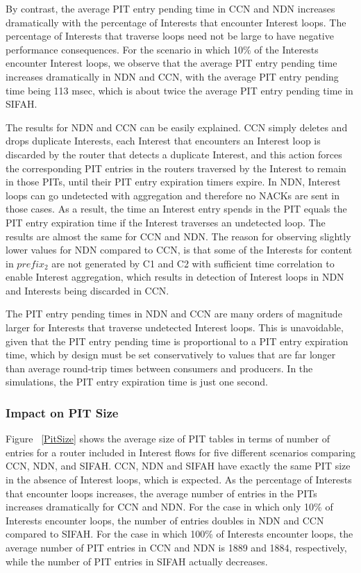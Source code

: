 \documentclass{ancs15-alternate}
\begin{document}
By contrast, the average PIT entry pending time in CCN and NDN increases dramatically with the percentage of  Interests that 
encounter  Interest loops. The percentage of Interests that traverse loops need not be large to have negative performance consequences. For the scenario in which  10\%  of the Interests 
encounter Interest  loops, we observe that the average PIT entry pending time increases dramatically in NDN and CCN, with the average PIT entry pending time being 113 msec, which is about twice the average PIT entry pending time in SIFAH.  

The results for NDN and CCN can be easily explained. CCN simply deletes and drops duplicate Interests, each Interest that encounters an Interest loop is discarded by the router that detects a duplicate Interest, and this action forces the corresponding PIT entries in the routers traversed by the Interest to remain in those PITs, until their PIT entry expiration timers expire. 
In NDN, Interest loops  can go undetected with aggregation and therefore no NACKs are sent in those cases. As a result, the time an Interest entry spends in the PIT  equals the PIT entry expiration time if the Interest traverses an undetected loop.
The results are almost the same for CCN and NDN. The reason for observing slightly lower values for NDN compared to CCN, is that some of the Interests for content in $prefix_2$ are not generated by C1 and C2 with sufficient time correlation to enable  Interest aggregation, which results in detection of Interest loops in NDN and Interests being discarded in CCN.

The PIT entry pending times in NDN and CCN are many orders of magnitude larger for Interests that traverse undetected Interest loops. This is unavoidable,  given that the PIT entry pending time is  proportional to a PIT entry expiration time, which by design must be set conservatively to values that are far longer than average round-trip times between consumers and producers. 
In the simulations, the PIT entry expiration time is just one second.

\subsubsection{Impact on PIT Size}

Figure ~\ref{PitSize} shows the average size of PIT tables in terms of number of entries for a router included in Interest  flows for five different scenarios comparing CCN, NDN, and SIFAH. CCN, NDN and SIFAH have exactly the same PIT size in the absence of Interest loops, which is expected. As the  percentage of Interests that  encounter loops increases, the average number of entries in the PITs increases dramatically for CCN and NDN. For the case in which  only 10\%  of Interests encounter loops,  the number of entries doubles in NDN and CCN compared to SIFAH. For the case in which  100\% of Interests encounter loops, the average number of PIT entries in CCN and NDN is 1889 and 1884, respectively,  while the number of  PIT entries in SIFAH 
actually decreases. 
\end{document}
